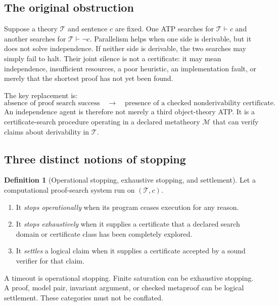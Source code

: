 \documentclass[11pt]{article}
\theoremstyle{definition}
\newtheorem{definition}[theorem]{Definition}
\theoremstyle{remark}
\newcommand{\M}{\mathcal M}
\newcommand{\T}{\mathcal T}
\begin{document}
\subsection{The original obstruction}
Suppose a theory $\T$ and sentence $c$ are fixed. One ATP searches for $\T\vdash c$ and another searches for $\T\vdash\neg c$. Parallelism helps when one side is derivable, but it does not solve independence. If neither side is derivable, the two searches may simply fail to halt. Their joint silence is not a certificate: it may mean independence, insufficient resources, a poor heuristic, an implementation fault, or merely that the shortest proof has not yet been found.

The key replacement is:
\[
\text{absence of proof search success}
\quad\longrightarrow\quad
\text{presence of a checked nonderivability certificate}.
\]
An independence agent is therefore not merely a third object-theory ATP. It is a certificate-search procedure operating in a declared metatheory $\M$ that can verify claims about derivability in $\T$.

\subsection{Three distinct notions of stopping}
\begin{definition}[Operational stopping, exhaustive stopping, and settlement]
Let a computational proof-search system run on $(\T,c)$.
\begin{enumerate}[label=(\roman*)]
  \item It \emph{stops operationally} when its program ceases execution for any reason.
  \item It \emph{stops exhaustively} when it supplies a certificate that a declared search domain or certificate class has been completely explored.
  \item It \emph{settles} a logical claim when it supplies a certificate accepted by a sound verifier for that claim.
\end{enumerate}
\end{definition}

A timeout is operational stopping. Finite saturation can be exhaustive stopping. A proof, model pair, invariant argument, or checked metaproof can be logical settlement. These categories must not be conflated.
\end{document}
